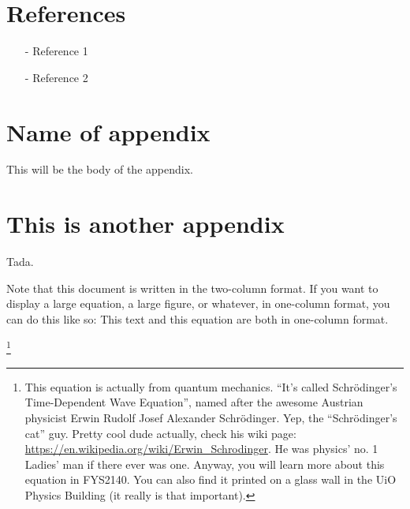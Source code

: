 \documentclass[reprint,english,notitlepage]{revtex4-1}  %
\begin{document}
\section*{References}  %
\begin{itemize}
\item[-]Reference 1
\item[-]Reference 2
\end{itemize}

\newpage
\appendix
\section{Name of appendix}
This will be the body of the appendix.
\section{This is another appendix}\label{appendix}
Tada.


\clearpage
Note that this document is written in the two-column format. If you want to display a large equation, a large figure, or whatever, in one-column format, you can do this like so:
\onecolumngrid
\vspace{1cm} %
This text and this equation are both in one-column format.

\footnote{This equation is actually from quantum mechanics. ``It's called Schrödinger's Time-Dependent Wave Equation'', named after the awesome Austrian physicist Erwin Rudolf Josef Alexander Schrödinger. Yep, the ``Schrödinger's cat'' guy. Pretty cool dude actually, check his wiki page: \url{https://en.wikipedia.org/wiki/Erwin_Schrodinger}. He was physics' no. 1 Ladies' man if there ever was one. Anyway, you will learn more about this equation in FYS2140. You can also find it printed on a glass wall in the UiO Physics Building (it really is that important).}
\end{document}
